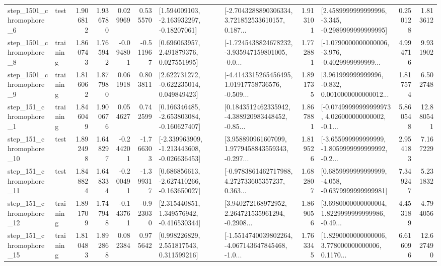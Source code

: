 \begin{tabular}{llrrrrllrlrr}
  step\_1501\_chromophore\_6 &      test &      1.906812 &    1.936780 &      0.029969 &  0.535570 &    [1.594009103, -2.163932297, -0.18207061] &  [-2.7043288890306334, 3.721852533610157, 0.187... &       1.913101 &  [2.4589999999999996, -3.345, -0.2989999999999995] &            0.250128 &          1.813612 \\
  step\_1501\_chromophore\_8 &  training &      1.860743 &    1.765942 &     -0.094801 & -0.511967 &     [0.696063957, 2.491879376, 0.027551995] &  [-1.7245438824678232, -3.935947159801005, -0.0... &       1.772881 &  [-1.0790000000000006, -3.976, -0.4029999999999... &            4.994716 &          9.931902 \\
  step\_1501\_chromophore\_9 &  training &      1.816062 &    1.877980 &      0.061918 &  0.803811 &    [2.622731272, -0.622235014, 0.049849423] &  [-4.4143315265456495, 1.01917758736576, -0.509... &       1.891735 &  [3.961999999999996, -0.832, 0.0010000000000012... &            1.817574 &          6.502748 \\
   step\_151\_chromophore\_1 &  training &      1.846049 &    1.900676 &      0.054627 &  0.742599 &   [0.166346485, -2.653803084, -0.160627407] &  [0.1843512462335942, -4.388920983448452, -0.85... &       1.867881 &  [-0.07499999999999973, 4.026000000000002, -0.1... &            5.860548 &         12.880541 \\
  step\_151\_chromophore\_10 &      test &      1.892498 &    1.648297 &     -0.244201 & -1.766303 &  [-2.339963909, -1.213443608, -0.026636453] &  [3.958890961607099, 1.9779458843559343, -0.297... &       1.819526 &  [-3.655999999999999, -1.8059999999999992, -0.2... &            2.954183 &          7.167229 \\
  step\_151\_chromophore\_11 &      test &      1.848824 &    1.648334 &     -0.200491 & -1.399317 &   [0.686856613, -2.627410266, -0.163650027] &  [-0.9783861462717988, 4.272733605357237, 0.363... &       1.682807 &  [0.6859999999999999, -4.058, -0.6379999999999981] &            7.349247 &          5.231832 \\
  step\_151\_chromophore\_12 &  training &      1.891709 &    1.747948 &     -0.143761 & -0.923030 &    [2.315440851, 1.349576942, -0.416530344] &  [3.940272168972952, 2.264721535961294, -0.2908... &       1.869056 &  [3.6980000000000004, 1.8229999999999986, -0.49... &            4.453189 &          4.794056 \\
  step\_151\_chromophore\_15 &  training &      1.810483 &    1.892868 &      0.082384 &  0.975642 &     [0.998226829, 2.551817543, 0.311599216] &  [-1.5514740039802264, -4.067143647845468, -1.0... &       1.763345 &  [1.8290000000000006, 3.778000000000006, 0.1170... &            6.616096 &         12.627490 \\

\end{tabular}
